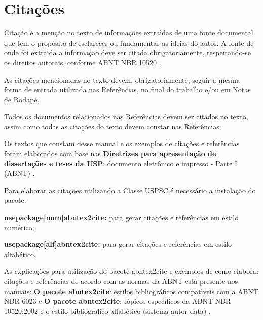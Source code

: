 

\chapter{Cita\c{c}\~oes}
\label{Cita\c{c}\~oes}
Cita\c{c}\~ao \'e a men\c{c}\~ao no texto de informa\c{c}\~oes extra\'{\i}das de uma fonte documental que tem o prop\'osito de esclarecer ou fundamentar as ideias do autor. A fonte de onde foi extra\'{\i}da a informa\c{c}\~ao deve ser citada obrigatoriamente, respeitando-se os direitos autorais, conforme ABNT NBR 10520 \cite{nbr10520}.

As cita\c{c}\~oes mencionadas no texto devem, obrigatoriamente, seguir a mesma forma de entrada utilizada nas Refer\^encias, no final do trabalho e/ou em Notas de Rodap\'e.

Todos os documentos relacionados nas Refer\^encias devem ser citados no texto, assim como todas as cita\c{c}\~oes do texto devem constar nas Refer\^encias. 

Os textos que constam desse manual e os exemplos de cita\c{c}\~oes e refer\^encias foram elaborados com base nas \textbf{Diretrizes para apresenta\c{c}\~ao de disserta\c{c}\~oes e teses da USP}: documento eletr\^onico e impresso - Parte I (ABNT) \cite{sibi2016}.

Para elaborar as cita\c{c}\~oes utilizando a Classe USPSC \'e necess\'ario a instala\c{c}\~ao do pacote: 

\begin{alineas}
	\item \textbf{usepackage[num]abntex2cite:} para gerar cita\c{c}\~oes e refer\^encias em estilo num\'erico;
	\item \textbf{usepackage[alf]abntex2cite:} para gerar cita\c{c}\~oes e refer\^encias em estilo alfab\'etico.
\end{alineas}

As explica\c{c}\~oes para utiliza\c{c}\~ao do pacote abntex2cite e exemplos de como elaborar cita\c{c}\~oes e refer\^encias de acordo com as normas da ABNT est\'a presente nos manuais: \textbf{O pacote abntex2cite}: estilos bibliogr\'aficos compat\'{\i}veis com a ABNT NBR 6023 \cite{abnetxcite} e  \textbf{O pacote abntex2cite}: t\'opicos espec\'{\i}ficos da ABNT NBR 10520:2002 e o estilo bibliogr\'afico alfab\'etico (sistema autor-data) \cite{abnetxcitealf}.

